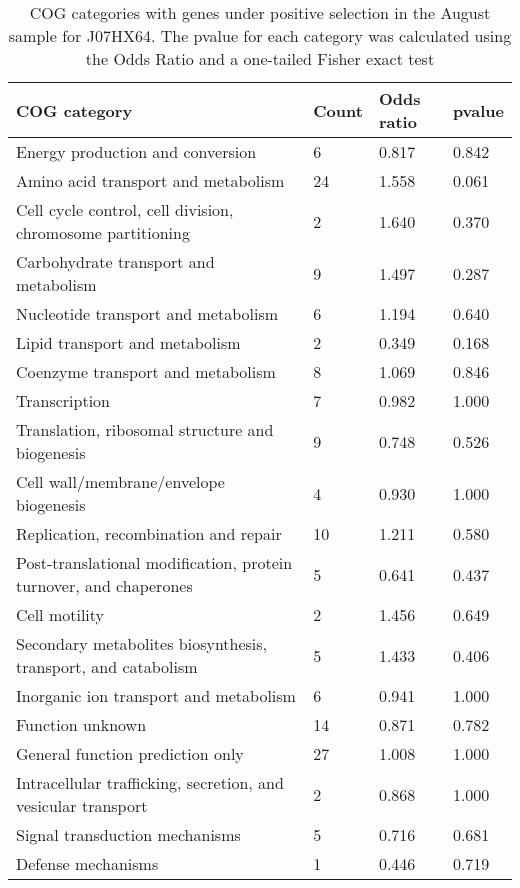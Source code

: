 \begin{table}[hb]
\footnotesize 
	\tabcolsep=0.11cm 
\caption{COG categories with genes under positive selection in the August sample for J07HX64. The pvalue for each category was calculated using the Odds Ratio and a one-tailed Fisher exact test \\} 
\begin{tabularx}{\textwidth}{L{6cm}R{2cm}R{2cm}R{2cm}} 
\hline 
\textbf{COG category} & \textbf{Count} & \textbf{Odds ratio} & \textbf{pvalue} \\ 
\hline 
Energy production and conversion & 6 & 0.817 & 0.842 \\ 
Amino acid transport and metabolism & 24 & 1.558 & 0.061 \\ 
Cell cycle control, cell division, chromosome partitioning & 2 & 1.640 & 0.370 \\ 
Carbohydrate transport and metabolism & 9 & 1.497 & 0.287 \\ 
Nucleotide transport and metabolism & 6 & 1.194 & 0.640 \\ 
Lipid transport and metabolism & 2 & 0.349 & 0.168 \\ 
Coenzyme transport and metabolism & 8 & 1.069 & 0.846 \\ 
Transcription & 7 & 0.982 & 1.000 \\ 
Translation, ribosomal structure and biogenesis & 9 & 0.748 & 0.526 \\ 
Cell wall/membrane/envelope biogenesis & 4 & 0.930 & 1.000 \\ 
Replication, recombination and repair & 10 & 1.211 & 0.580 \\ 
Post-translational modification, protein turnover, and chaperones & 5 & 0.641 & 0.437 \\ 
Cell motility & 2 & 1.456 & 0.649 \\ 
Secondary metabolites biosynthesis, transport, and catabolism & 5 & 1.433 & 0.406 \\ 
Inorganic ion transport and metabolism & 6 & 0.941 & 1.000 \\ 
Function unknown & 14 & 0.871 & 0.782 \\ 
General function prediction only & 27 & 1.008 & 1.000 \\ 
Intracellular trafficking, secretion, and vesicular transport & 2 & 0.868 & 1.000 \\ 
Signal transduction mechanisms & 5 & 0.716 & 0.681 \\ 
Defense mechanisms & 1 & 0.446 & 0.719 \\ 
\end{tabularx} 
\label{August_COG_Selection_J07HX64} 
 \end{table} 

